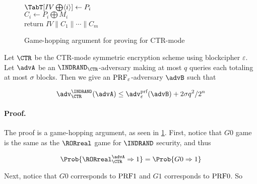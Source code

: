 \begin{figure}[p]
{    \ind $\TabT[IV \bigoplus \langle i \rangle] \gets P_i$ \\
    \ind $C_i \gets P_i \bigoplus M_i$ \\
    return $IV \parallel C_1 \parallel \cdots \parallel C_m$
	}
	\fpage{.25}{
    \underline{G4}\\[1pt]
    $b' \gets \advA^{\SEenc}$ \\
    return $b'$ \\
    \\
    \underline{$\SEenc(M)$}\\[1pt]
    $IV \getsr \{0,1\}^n$ \\
    $M_1, \ldots, M_m \gets^{m} M$ \\
    for $i = 1$ to $m$ do \\
    \ind if $\TabT[IV \bigoplus \langle i \rangle] \neq \bot]$ then \\
    \ind\ind $\badtrue$ \\
    \ind $\TabT[IV \bigoplus \langle i \rangle] \gets 1$ \\
    \ind $C_i \getsr \{0,1\}^n$ \\
    return $IV \parallel C_1 \parallel \cdots \parallel C_m$
	}
  \caption{Game-hopping argument for proving \INDRAND for CTR-mode}
  \label{fig:indrand-ctr}
\end{figure}


\begin{theorem}
Let $\CTR$ be the CTR-mode symmetric encryption scheme using blockcipher
$\varepsilon$.  Let $\advA$ be an $\INDRAND_{\CTR}$-adversary making at most
$q$ queries each totaling at most $\sigma$ blocks. Then we give an
$\textup{PRF}_{\varepsilon}$-adversary $\advB$ such that

$$
  \adv^{\INDRAND}_{\CTR}(\advA) \leq \adv^{\textup{prf}}_{\varepsilon}(\advB) + 2 \sigma q^2 / 2^n
$$
\end{theorem}

\paragraph{Proof.}

The proof is a game-hopping argument, as seen in \cref{fig:indrand-ctr}.
First, notice that $G0$ game is the same as the $\RORreal$ game for $\INDRAND$
security, and thus

$$
\Prob{\RORreal^{\advA}_{\CTR} \Rightarrow 1} = \Prob{G0 \Rightarrow 1}
$$

Next, notice that $G0$ corresponds to $\textup{PRF1}$ and $G1$ corresponds to
$\textup{PRF0}$. So

